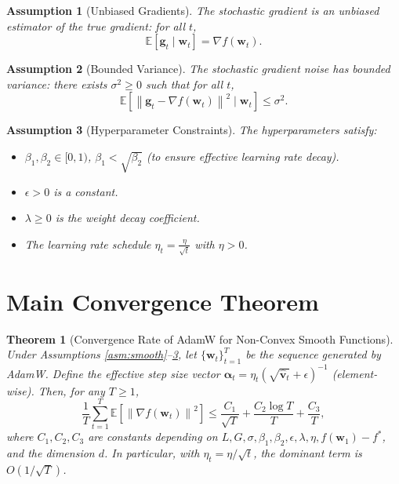 \documentclass{article}
\theoremstyle{plain}
\newtheorem{assumption}{Assumption}
\newtheorem{theorem}{Theorem}
\theoremstyle{definition}
\renewcommand{\vec}[1]{\boldsymbol{#1}}
\newcommand{\norm}[1]{\left\| #1 \right\|}
\newcommand{\expect}[1]{\mathbb{E}\left[ #1 \right]}
\begin{document}
\begin{assumption}[Unbiased Gradients] \label{asm:unbiased}
The stochastic gradient is an unbiased estimator of the true gradient: for all $t$,
\begin{equation}
    \expect{\vec{g}_t \mid \vec{w}_t} = \nabla f(\vec{w}_t).
\end{equation}
\end{assumption}

\begin{assumption}[Bounded Variance] \label{asm:variance}
The stochastic gradient noise has bounded variance: there exists $\sigma^2 \ge 0$ such that for all $t$,
\begin{equation}
    \expect{\norm{\vec{g}_t - \nabla f(\vec{w}_t)}^2 \mid \vec{w}_t} \le \sigma^2.
\end{equation}
\end{assumption}

\begin{assumption}[Hyperparameter Constraints] \label{asm:hyper}
The hyperparameters satisfy:
\begin{itemize}
    \item $\beta_1, \beta_2 \in [0,1)$, $\beta_1 < \sqrt{\beta_2}$ (to ensure effective learning rate decay).
    \item $\epsilon > 0$ is a constant.
    \item $\lambda \ge 0$ is the weight decay coefficient.
    \item The learning rate schedule $\eta_t = \frac{\eta}{\sqrt{t}}$ with $\eta > 0$.
\end{itemize}
\end{assumption}

\section*{Main Convergence Theorem}

\begin{theorem}[Convergence Rate of AdamW for Non-Convex Smooth Functions] \label{thm:main}
Under Assumptions \ref{asm:smooth}--\ref{asm:hyper}, let $\{\vec{w}_t\}_{t=1}^T$ be the sequence generated by AdamW. Define the effective step size vector $\vec{\alpha}_t = \eta_t (\sqrt{\hat{\vec{v}}_t} + \epsilon)^{-1}$ (element-wise). Then, for any $T \ge 1$,
\begin{equation}
    \frac{1}{T} \sum_{t=1}^T \expect{\norm{\nabla f(\vec{w}_t)}^2} \le \frac{C_1}{\sqrt{T}} + \frac{C_2 \log T}{T} + \frac{C_3}{T},
\end{equation}
where $C_1, C_2, C_3$ are constants depending on $L, G, \sigma, \beta_1, \beta_2, \epsilon, \lambda, \eta, f(\vec{w}_1) - f^*$, and the dimension $d$. In particular, with $\eta_t = \eta / \sqrt{t}$, the dominant term is $O(1/\sqrt{T})$.
\end{theorem}
\end{document}
